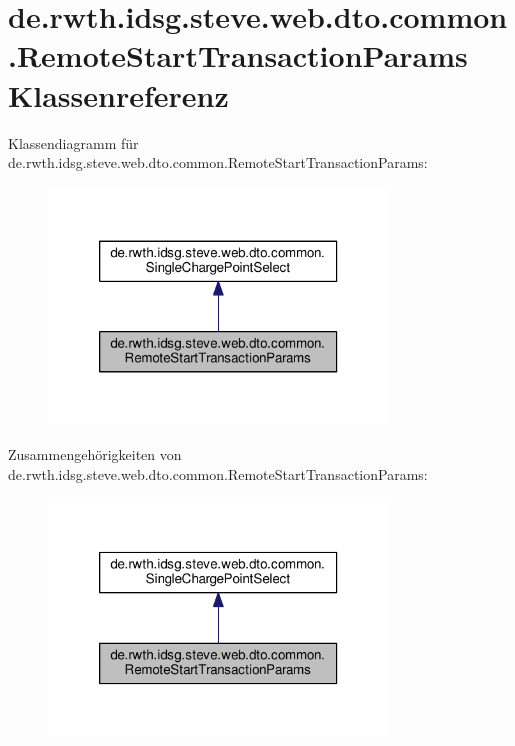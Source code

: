 \hypertarget{classde_1_1rwth_1_1idsg_1_1steve_1_1web_1_1dto_1_1common_1_1_remote_start_transaction_params}{\section{de.\-rwth.\-idsg.\-steve.\-web.\-dto.\-common.\-Remote\-Start\-Transaction\-Params Klassenreferenz}
\label{classde_1_1rwth_1_1idsg_1_1steve_1_1web_1_1dto_1_1common_1_1_remote_start_transaction_params}
}


Klassendiagramm für de.\-rwth.\-idsg.\-steve.\-web.\-dto.\-common.\-Remote\-Start\-Transaction\-Params\-:
\nopagebreak
\begin{figure}[H]
\begin{center}
\leavevmode
\includegraphics[width=256pt]{classde_1_1rwth_1_1idsg_1_1steve_1_1web_1_1dto_1_1common_1_1_remote_start_transaction_params__inherit__graph}
\end{center}
\end{figure}


Zusammengehörigkeiten von de.\-rwth.\-idsg.\-steve.\-web.\-dto.\-common.\-Remote\-Start\-Transaction\-Params\-:
\nopagebreak
\begin{figure}[H]
\begin{center}
\leavevmode
\includegraphics[width=256pt]{classde_1_1rwth_1_1idsg_1_1steve_1_1web_1_1dto_1_1common_1_1_remote_start_transaction_params__coll__graph}
\end{center}
\end{figure}

